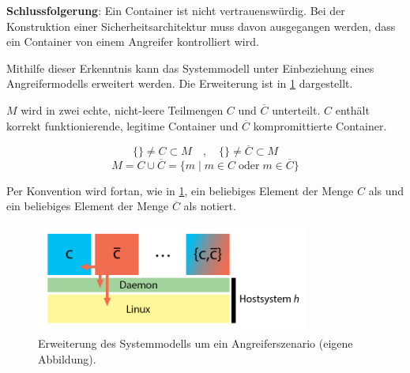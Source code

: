 \documentclass[../main.tex]{subfiles}
\begin{document}
    \textbf{Schlussfolgerung}: Ein Container ist nicht vertrauenswürdig. Bei der Konstruktion einer Sicherheitsarchitektur muss davon ausgegangen werden, dass ein Container von einem Angreifer kontrolliert wird.

    Mithilfe dieser Erkenntnis kann das Systemmodell unter Einbeziehung eines Angreifermodells erweitert werden. Die Erweiterung ist in \fig \ref{fig:question_model2} dargestellt.

    \(M\) wird in zwei echte, nicht-leere Teilmengen \(C\) und \(\overline{C}\) unterteilt. \(C\) enthält korrekt funktionierende, legitime Container und \(\overline{C}\) kompromittierte Container.

    \begin{equation}
    \label{eq:subsets}
      \{\}\neq C \subset M \quad,\quad \{\}\neq \overline{C} \subset M %
    \end{equation}
    \begin{equation}
    \label{eq:unionset}
      M = C \cup \overline{C} = \{m \; | \; m\in C \; \text{oder} \; m\in \overline{C}\}
    \end{equation}

    Per Konvention wird fortan, wie in \fig \ref{fig:question_model2}, ein beliebiges Element der Menge \(C\) als \cvalid{} und ein beliebiges Element der Menge \(\overline{C}\) als \cbroken{} notiert.

    \begin{figure}[h]
        \centering
        \includegraphics[width=0.8\textwidth]{./images/question_model2.png}
        \caption{Erweiterung des Systemmodells um ein Angreiferszenario (eigene Abbildung).}
        \label{fig:question_model2}
    \end{figure}
\end{document}
